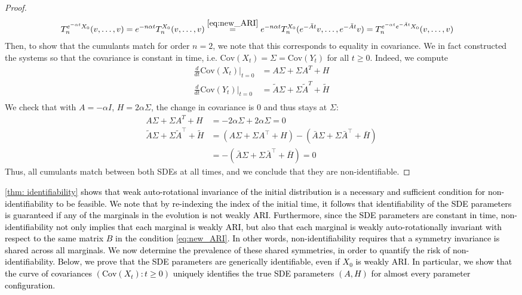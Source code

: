 \documentclass[twoside,11pt]{article}
\newcommand{\cov} {\mathrm{Cov}}
\newcommand{\rv}[1]{\textcolor{black}{#1}}
\begin{document}
\begin{proof}
{\begin{align*}
T_n^{e^{-\alpha t}X_0}(v, \ldots, v) &= e^{-n\alpha t}T_n^{X_0}(v, \ldots, v)
\overset{\eqref{eq:new_ARI}}{=} e^{-n\alpha t}T_n^{X_0}(e^{-\bar{A}t}v, \ldots, e^{-\bar{A}t}v)
= T_n^{e^{-\alpha t}e^{-\bar{A}t}X_0}(v, \ldots, v)
\end{align*}
Then, to show that the cumulants match for order $n=2$, we note that this corresponds to equality in covariance. We in fact constructed the systems so that the covariance is constant in time, i.e. $\cov(X_t)=\Sigma =\cov(Y_t)$ for all $t \ge 0$. Indeed, we compute
\begin{align*}
    \frac{d}{dt}\cov(X_t)|_{t=0} &= A\Sigma + \Sigma A^T + H\\
    \frac{d}{dt}\cov(Y_t)|_{t=0} &= \tilde{A}\Sigma + \Sigma\tilde{A}^T + \tilde{H}\\
\end{align*}
We check that with $A = -\alpha I$, $H=2\alpha \Sigma$, the change in covariance is $0$ and thus stays at $\Sigma$:
\begin{align*}
    A\Sigma + \Sigma A^T + H &= -2\alpha \Sigma + 2\alpha \Sigma = 0\\
    \tilde{A}\Sigma + \Sigma\tilde{A}^\top + \tilde{H}&= (A\Sigma + \Sigma A^\top + H) -\left(\bar{A}\Sigma + \Sigma\bar{A}^\top + \bar{H} \right)\\
    &= -\left(\bar{A}\Sigma+ \Sigma\bar{A}^\top + \bar{H} \right) = 0
\end{align*}
Thus, all cumulants match between both SDEs at all times, and we conclude that they are non-identifiable.}
\end{proof}

\rv{\cref{thm: identifiability} shows that weak auto-rotational invariance of the initial distribution is a necessary and sufficient condition for non-identifiability to be feasible. We note that by re-indexing the index of the initial time, it follows that identifiability of the SDE parameters is guaranteed if any of the marginals in the evolution is not weakly ARI. Furthermore, since the SDE parameters are constant in time, non-identifiability not only implies that each marginal is weakly ARI, but also that each marginal is weakly auto-rotationally invariant with respect to the same matrix $B$ in the condition \eqref{eq:new_ARI}.  In other words, non-identifiability requires that a symmetry invariance is shared across all marginals. We now determine the prevalence of these shared symmetries, in order to quantify the risk of non-identifiability. Below, we prove that the SDE parameters are generically identifiable, even if $X_0$ is weakly ARI. In particular, we show that the curve of covariances $(\cov(X_t): t \ge 0)$ uniquely identifies the true SDE parameters $(A,H)$ for almost every parameter configuration.}
\end{document}
